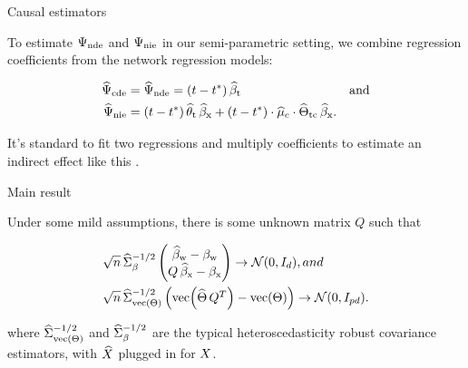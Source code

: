\documentclass{beamer}
\theoremstyle{remark}
\begin{document}
\begin{frame}{Causal estimators}

    To estimate $\Psi_\mathrm{nde}$ and $\Psi_\mathrm{nie}$ in our semi-parametric setting, we combine regression coefficients from the network regression models:

    \begin{align*}
        \cdehat & = \ndehat = \paren*{t - t^*} \, \betathat                                                                              & \text{and} \\
        \niehat & = \paren*{t - t^*} \, \thetathat \, \betaxhat + \paren*{t - t^*} \cdot \widehat{\mu}_c \cdot \Thetatchat \, \betaxhat.
    \end{align*}

    It's standard to fit two regressions and multiply coefficients to estimate an indirect effect like this \citep{vanderweele_mediation_2014}.

\end{frame}

\begin{frame}{Main result}

    \begin{theorem}

        \vspace{2mm}

        Under some mild assumptions, there is some unknown matrix $Q$ such that

        \begin{equation*}
            \begin{aligned}
                \sqrt{ n } \,
                 & \Sigmahatbeta^{-1/2}
                \begin{pmatrix}
                    \betawhat - \betaw \\
                    Q \, \betaxhat - \betax
                \end{pmatrix}
                \to
                \Normal{0}{I_d}, and     \\
                \sqrt{ n } \,
                 & \Sigmahattheta^{-1/2}
                \begin{pmatrix}
                    \vecc \paren*{\Thetahat \, Q^T} - \Thetavec
                \end{pmatrix}
                \to
                \Normal{0}{I_{p d}}.
            \end{aligned}
        \end{equation*}

        \noindent where $\widehat{\Sigma}_{\operatorname*{vec} \left(\Theta\right)}^{-1/2}$ and $\widehat{\Sigma}_\beta^{-1/2}$ are the typical heteroscedasticity robust covariance estimators, with $\widehat{X}$ plugged in for $X$.
    \end{theorem}
\end{frame}
\end{document}
